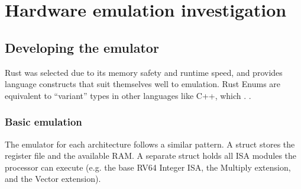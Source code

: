 \chapter{Hardware emulation investigation}



\section{Developing the emulator}\label{chap:software:sec:emu}
Rust was selected due to its memory safety and runtime speed, and provides language constructs that suit themselves well to emulation.
Rust Enums are equivalent to \enquote{variant} types in other languages like C++, which \todomark{}.
.

\subsection{Basic emulation}
The emulator for each architecture follows a similar pattern.
A  struct stores the register file and the available RAM.
A separate  struct holds all ISA modules the processor can execute (e.g. the base RV64 Integer ISA, the Multiply extension, and the Vector extension).

